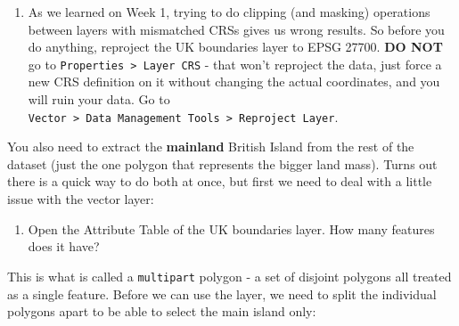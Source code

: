 \documentclass[
  letterpaper,
  DIV=11,
  numbers=noendperiod]{scrreprt}
\providecommand{\tightlist}{%
  \setlength{\itemsep}{0pt}\setlength{\parskip}{0pt}}\usepackage{longtable,booktabs,array}
\begin{document}
\begin{enumerate}
\def\labelenumi{(\arabic{enumi})}
\setcounter{enumi}{124}
\tightlist
\item
  As we learned on Week 1, trying to do clipping (and masking)
  operations between layers with mismatched CRSs gives us wrong results.
  So before you do anything, reproject the UK boundaries layer to EPSG
  27700. \textbf{DO NOT} go to
  \texttt{Properties\ \textgreater{}\ Layer\ CRS} - that won't reproject
  the data, just force a new CRS definition on it without changing the
  actual coordinates, and you will ruin your data. Go to
  \texttt{Vector\ \textgreater{}\ Data\ Management\ Tools\ \textgreater{}\ Reproject\ Layer}.
\end{enumerate}

You also need to extract the \textbf{mainland} British Island from the
rest of the dataset (just the one polygon that represents the bigger
land mass). Turns out there is a quick way to do both at once, but first
we need to deal with a little issue with the vector layer:

\begin{enumerate}
\def\labelenumi{(\arabic{enumi})}
\setcounter{enumi}{125}
\tightlist
\item
  Open the Attribute Table of the UK boundaries layer. How many features
  does it have?
\end{enumerate}

This is what is called a \texttt{multipart} polygon - a set of disjoint
polygons all treated as a single feature. Before we can use the layer,
we need to split the individual polygons apart to be able to select the
main island only:
\end{document}
